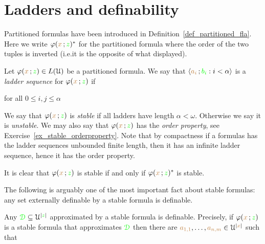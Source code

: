 \documentclass[creche.tex]{subfiles}
\begin{document}
\section{Ladders and definability}

Partitioned formulas have been introduced in Definition~\ref{def_partitioned_fla}. Here we write \emph{$\varphi({\color{brown} x}\,;{\color{green} z})^*$\/} for the partitioned formula where the order of the two tuples is inverted (i.e.\@ it is the opposite of what displayed).

Let $\varphi({\color{brown} x}\,;{\color{green} z})\in L(\EuScript U)$ be a partitioned formula. We say that $\langle{\color{brown}a_i}\,;{\color{green} b_i} : i<\alpha\rangle$ is a \emph{ladder sequence\/} for $\varphi({\color{brown} x}\,;{\color{green} z})$ if 

\hfill for all $0\le i,j\le\alpha$

We say that $\varphi({\color{brown} x}\,;{\color{green} z})$ is \emph{stable\/} if all ladders have length $\alpha<\omega$. Otherwise we say it is \emph{unstable}. We may also say that  $\varphi({\color{brown} x}\,;{\color{green} z})$ has the \emph{order property}, see Exercise~\ref{ex_stable_orderproperty}. 
Note that by compactness if a formulas has the ladder sequences unbounded finite length, then it has an infinite ladder sequence, hence it has the order property.

It is clear that $\varphi({\color{brown} x}\,;{\color{green} z})$ is stable if and only if $\varphi({\color{brown} x}\,;{\color{green} z})^*$ is stable.


The following is arguably one of the most important fact about stable formulas: any set externally definable by a stable formula is definable.

\begin{theorem}\label{thm_def_stable_formula}
Any ${\color{green}\EuScript D}\subseteq\EuScript U^{|{\color{green} z}|}$ approximated by a stable formula is definable.
Precisely, if $\varphi({\color{brown} x}\,;{\color{green} z})$ is a stable formula that approximates ${\color{green}\EuScript D}$ then there are ${\color{brown} a_{1,1}},\dots,{\color{brown} a_{n,m}}\in\EuScript U^{|{\color{brown} x}|}$ such that 

\end{theorem}
\end{document}
